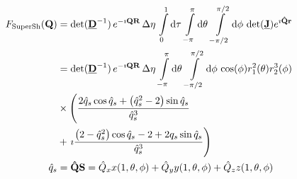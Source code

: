 \begin{align}\label{eq:FTsupershapes}
  F_\mathrm{SuperSh}(\B{Q}) &=
\det(\M{D}^{-1})\, e^{-\imath\B{QR}}\, \Delta\eta\, \int\limits_{0}^1
\mathrm{d}\tau\, \int\limits_{-\pi}^{\pi} \mathrm{d}\theta\,  \int\limits_{-\pi/2}^{\pi/2} \mathrm{d}\phi \,
\det(\M{J})e^{\imath\B{\hat{Q}r}} \\
&= \det(\M{D}^{-1})\, e^{-\imath\B{QR}}\, \Delta\eta\, \int\limits_{-\pi}^{\pi} \mathrm{d}\theta\,  \int\limits_{-\pi/2}^{\pi/2} \mathrm{d}\phi \,
\cos (\phi ) r_1^2(\theta) r_2^3(\phi)  \\
&\times     \left( \frac{2\hat{q}_s\cos \hat{q}_s + \left(\hat{q}_s^2-2\right)\sin \hat{q}_s}{\hat{q}_s^3} \right.
    \nonumber \\
   & + \left. \imath \frac{\left(2 - \hat{q}_s^2\right)\cos \hat{q}_s-2 + 2q_s\sin \hat{q}_s}{\hat{q}_s^3}  \right) \nonumber \\
\hat{q}_s &= \B{\hat{Q}}\B{S}=\hat{Q}_x x(1,\theta,\phi)+\hat{Q}_y y(1,\theta,\phi)+\hat{Q}_z z(1,\theta,\phi)
\end{align}
\clearpage
